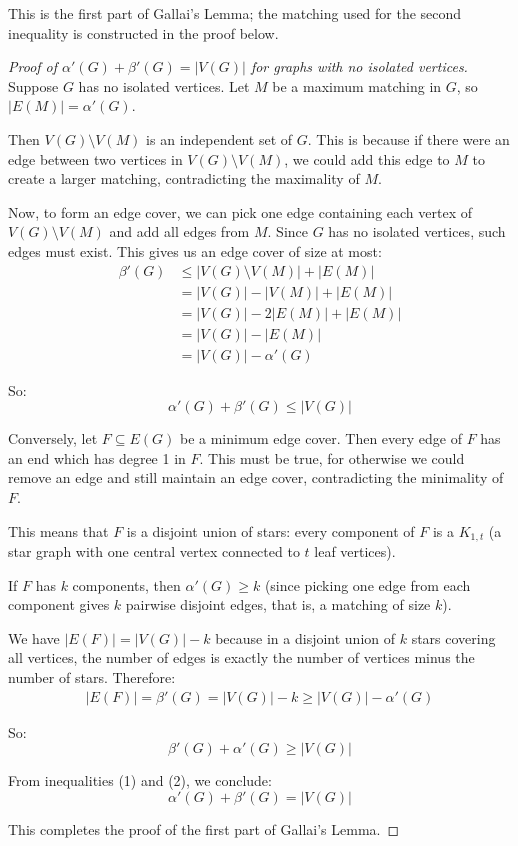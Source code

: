 \documentclass{article}
\theoremstyle{definition}
\begin{document}
This is the first part of Gallai's Lemma; the matching used for the second inequality is constructed in the proof below.
\begin{proof}[Proof of $\alpha'(G) + \beta'(G) = |V(G)|$ for graphs with no isolated vertices]
Suppose $G$ has no isolated vertices. Let $M$ be a maximum matching in $G$, so $|E(M)| = \alpha'(G)$.

Then $V(G) \setminus V(M)$ is an independent set of $G$. This is because if there were an edge between two vertices in $V(G) \setminus V(M)$, we could add this edge to $M$ to create a larger matching, contradicting the maximality of $M$.

Now, to form an edge cover, we can pick one edge containing each vertex of $V(G) \setminus V(M)$ and add all edges from $M$. Since $G$ has no isolated vertices, such edges must exist. This gives us an edge cover of size at most:
\begin{align}
\beta'(G) &\leq |V(G) \setminus V(M)| + |E(M)| \\
&= |V(G)| - |V(M)| + |E(M)| \\
&= |V(G)| - 2|E(M)| + |E(M)| \\
&= |V(G)| - |E(M)| \\
&= |V(G)| - \alpha'(G)
\end{align}

So:
\begin{equation}
\alpha'(G) + \beta'(G) \leq |V(G)| \tag{1}
\end{equation}

Conversely, let $F \subseteq E(G)$ be a minimum edge cover. Then every edge of $F$ has an end which has degree 1 in $F$. This must be true, for otherwise we could remove an edge and still maintain an edge cover, contradicting the minimality of $F$.

This means that $F$ is a disjoint union of stars: every component of $F$ is a $K_{1,t}$ (a star graph with one central vertex connected to $t$ leaf vertices).

If $F$ has $k$ components, then $\alpha'(G) \geq k$ (since picking one edge from each component gives $k$ pairwise disjoint edges, that is, a matching of size $k$).

We have $|E(F)| = |V(G)| - k$ because in a disjoint union of $k$ stars covering all vertices, the number of edges is exactly the number of vertices minus the number of stars. Therefore:
\begin{align}
|E(F)| = \beta'(G) = |V(G)| - k \geq |V(G)| - \alpha'(G)
\end{align}

So:
\begin{equation}
\beta'(G) + \alpha'(G) \geq |V(G)| \tag{2}
\end{equation}

From inequalities (1) and (2), we conclude:
\begin{equation}
\alpha'(G) + \beta'(G) = |V(G)|
\end{equation}

This completes the proof of the first part of Gallai's Lemma.
\end{proof}
\end{document}
